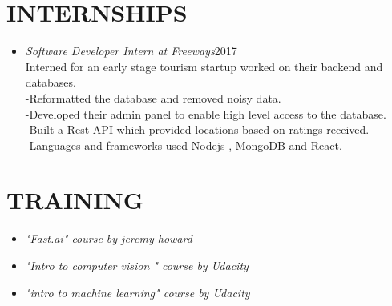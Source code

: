 \documentclass[margin]{res}
\begin{document}
\begin{resume}
\section{INTERNSHIPS} \begin{itemize}
 \item{\large{\sl Software Developer Intern at Freeways}}\hfill 2017 \\
 	Interned for an early stage tourism startup worked on their backend and databases.\\
	-Reformatted the database and removed noisy data.\\
	-Developed their admin panel to enable high level access to the database.\\
	-Built a Rest API which  provided locations  based on ratings received.\\
	-Languages and frameworks used Nodejs , MongoDB and React.\\
 \end{itemize}

\section{TRAINING}\begin{itemize}
 \item{\sl  "Fast.ai" course by jeremy howard }
 \item{\sl  "Intro to computer vision " course by Udacity}
 \item{\sl  "intro to machine learning" course by Udacity}
 \end{itemize}


\end{resume}
\end{document}
